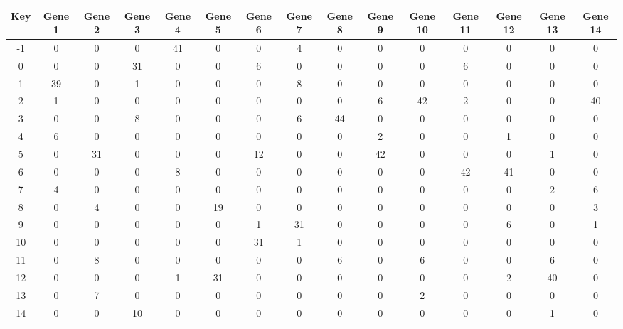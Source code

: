 \begin{tabular}{|c|c|c|c|c|c|c|c|c|c|c|c|c|c|c|}
\hline
Key & Gene 1 & Gene 2 & Gene 3 & Gene 4 & Gene 5 & Gene 6 & Gene 7 & Gene 8 & Gene 9 & Gene 10 & Gene 11 & Gene 12 & Gene 13 & Gene 14 \\
\hline
-1 & 0 & 0 & 0 & 41 & 0 & 0 & 4 & 0 & 0 & 0 & 0 & 0 & 0 & 0 \\
0 & 0 & 0 & 31 & 0 & 0 & 6 & 0 & 0 & 0 & 0 & 6 & 0 & 0 & 0 \\
1 & 39 & 0 & 1 & 0 & 0 & 0 & 8 & 0 & 0 & 0 & 0 & 0 & 0 & 0 \\
2 & 1 & 0 & 0 & 0 & 0 & 0 & 0 & 0 & 6 & 42 & 2 & 0 & 0 & 40 \\
3 & 0 & 0 & 8 & 0 & 0 & 0 & 6 & 44 & 0 & 0 & 0 & 0 & 0 & 0 \\
4 & 6 & 0 & 0 & 0 & 0 & 0 & 0 & 0 & 2 & 0 & 0 & 1 & 0 & 0 \\
5 & 0 & 31 & 0 & 0 & 0 & 12 & 0 & 0 & 42 & 0 & 0 & 0 & 1 & 0 \\
6 & 0 & 0 & 0 & 8 & 0 & 0 & 0 & 0 & 0 & 0 & 42 & 41 & 0 & 0 \\
7 & 4 & 0 & 0 & 0 & 0 & 0 & 0 & 0 & 0 & 0 & 0 & 0 & 2 & 6 \\
8 & 0 & 4 & 0 & 0 & 19 & 0 & 0 & 0 & 0 & 0 & 0 & 0 & 0 & 3 \\
9 & 0 & 0 & 0 & 0 & 0 & 1 & 31 & 0 & 0 & 0 & 0 & 6 & 0 & 1 \\
10 & 0 & 0 & 0 & 0 & 0 & 31 & 1 & 0 & 0 & 0 & 0 & 0 & 0 & 0 \\
11 & 0 & 8 & 0 & 0 & 0 & 0 & 0 & 6 & 0 & 6 & 0 & 0 & 6 & 0 \\
12 & 0 & 0 & 0 & 1 & 31 & 0 & 0 & 0 & 0 & 0 & 0 & 2 & 40 & 0 \\
13 & 0 & 7 & 0 & 0 & 0 & 0 & 0 & 0 & 0 & 2 & 0 & 0 & 0 & 0 \\
14 & 0 & 0 & 10 & 0 & 0 & 0 & 0 & 0 & 0 & 0 & 0 & 0 & 1 & 0 \\
\hline
\end{tabular}